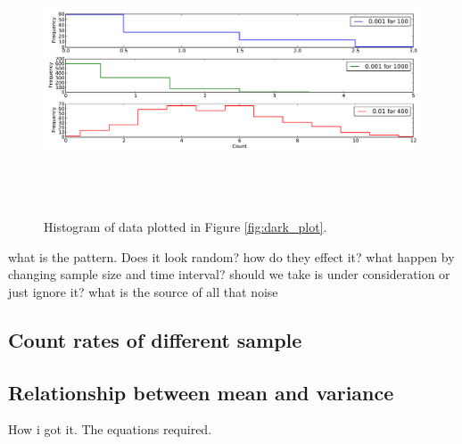 \documentclass[a4paper,12pt]{article}
\begin{document}
\begin{figure}[H]
\centering
\includegraphics[angle=0,height=8cm,width=15.5cm]{graphs/dark_hist.pdf}
\caption{Histogram of data plotted in Figure \ref{fig:dark_plot}.}
\label{fig:dark_hist}
\end{figure}

what is the pattern. Does it look random? how do they effect it? what happen by changing sample size and time interval? should we take is under consideration or just ignore it? what is the source of all that noise

\subsection{Count rates of different sample}
\label{sec:countrate}

\subsection{Relationship between mean and variance}
\label{sec:meanandvariance}
How i got it. The equations required. 
\end{document}
